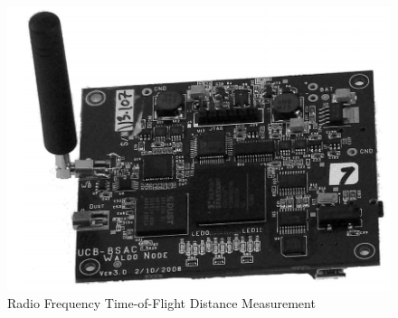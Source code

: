 \begin{figure}[htb]
	\caption{\label{fig:projeto}Radio Frequency Time-of-Flight Distance Measurement}
	\begin{center}
		\includegraphics[width=1\textwidth]{020-fundamentacao/img/radio.png}
	\end{center}
\end{figure}

